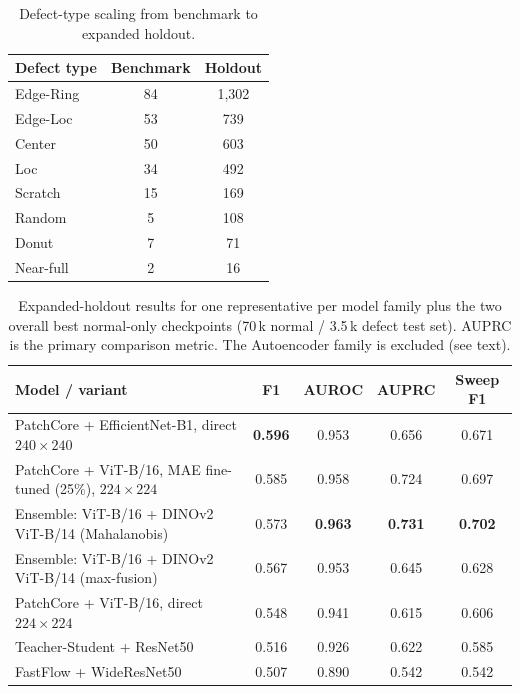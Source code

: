\documentclass[11pt]{article}
\begin{document}
\begin{table}[H]
\centering
\caption{Defect-type scaling from benchmark to expanded holdout.}
\label{tab:holdout_defects}
\begin{tabular}{lcc}
\toprule
Defect type & Benchmark & Holdout \\
\midrule
Edge-Ring & 84  & 1{,}302 \\
Edge-Loc  & 53  & 739     \\
Center    & 50  & 603     \\
Loc       & 34  & 492     \\
Scratch   & 15  & 169     \\
Random    &  5  & 108     \\
Donut     &  7  &  71     \\
Near-full &  2  &  16     \\
\bottomrule
\end{tabular}
\end{table}

\begin{table}[H]
\centering
\caption{Expanded-holdout results for one representative per model family plus the two
overall best normal-only checkpoints (70\,k normal / 3.5\,k defect test set).
AUPRC is the primary comparison metric. The Autoencoder family is excluded (see text).}
\label{tab:holdout_leaderboard}
\begin{tabularx}{\linewidth}{>{\raggedright\arraybackslash}Xcccc}
\toprule
Model / variant & F1 & AUROC & AUPRC & Sweep F1 \\
\midrule
PatchCore + EfficientNet-B1, direct $240{\times}240$          & \textbf{0.596} & 0.953 & 0.656 & 0.671 \\
PatchCore + ViT-B/16, MAE fine-tuned (25\%), $224{\times}224$ & 0.585 & 0.958 & 0.724 & 0.697 \\
Ensemble: ViT-B/16 + DINOv2 ViT-B/14 (Mahalanobis)          & 0.573 & \textbf{0.963} & \textbf{0.731} & \textbf{0.702} \\
Ensemble: ViT-B/16 + DINOv2 ViT-B/14 (max-fusion)           & 0.567 & 0.953 & 0.645 & 0.628 \\
PatchCore + ViT-B/16, direct $224{\times}224$                 & 0.548 & 0.941 & 0.615 & 0.606 \\
Teacher-Student + ResNet50                                    & 0.516 & 0.926 & 0.622 & 0.585 \\
FastFlow + WideResNet50                                       & 0.507 & 0.890 & 0.542 & 0.542 \\
\bottomrule
\end{tabularx}
\end{table}
\end{document}
